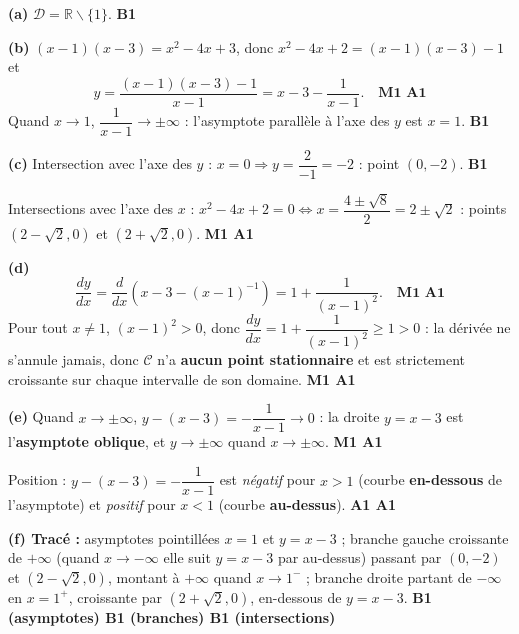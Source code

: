 \documentclass[11pt]{article}
\def\setminus{\mathbin{\backslash}}\let\smallsetminus\setminus
\begin{document}
\begin{corrige}
\textbf{(a)} $\mathcal{D} = \mathbb{R} \setminus \{1\}$. \hfill \textbf{B1}

\textbf{(b)} $(x-1)(x-3) = x^2 - 4x + 3$, donc $x^2 - 4x + 2 = (x-1)(x-3) - 1$ et
\[
y = \frac{(x-1)(x-3) - 1}{x-1} = x - 3 - \frac{1}{x-1}. \quad \textbf{M1 A1}
\]
Quand $x \to 1$, $\dfrac{1}{x-1} \to \pm\infty$ : l'asymptote parallèle à l'axe des $y$ est $x = 1$. \hfill \textbf{B1}

\textbf{(c)} Intersection avec l'axe des $y$ : $x = 0 \Rightarrow y = \dfrac{2}{-1} = -2$ : point $(0, -2)$. \hfill \textbf{B1}

Intersections avec l'axe des $x$ : $x^2 - 4x + 2 = 0 \iff x = \dfrac{4 \pm \sqrt{8}}{2} = 2 \pm \sqrt{2}$ : points $(2-\sqrt2, 0)$ et $(2+\sqrt2, 0)$. \hfill \textbf{M1 A1}

\textbf{(d)}
\[
\frac{dy}{dx} = \frac{d}{dx}\left(x - 3 - (x-1)^{-1}\right) = 1 + \frac{1}{(x-1)^2}. \quad \textbf{M1 A1}
\]
Pour tout $x \neq 1$, $(x-1)^2 > 0$, donc $\dfrac{dy}{dx} = 1 + \dfrac{1}{(x-1)^2} \ge 1 > 0$ : la dérivée ne s'annule jamais, donc $\mathcal{C}$ n'a \textbf{aucun point stationnaire} et est strictement croissante sur chaque intervalle de son domaine. \hfill \textbf{M1 A1}

\textbf{(e)} Quand $x \to \pm\infty$, $y - (x-3) = -\dfrac{1}{x-1} \to 0$ : la droite $y = x - 3$ est l'\textbf{asymptote oblique}, et $y \to \pm\infty$ quand $x \to \pm\infty$. \hfill \textbf{M1 A1}

Position : $y - (x-3) = -\dfrac{1}{x-1}$ est \emph{négatif} pour $x > 1$ (courbe \textbf{en-dessous} de l'asymptote) et \emph{positif} pour $x < 1$ (courbe \textbf{au-dessus}). \hfill \textbf{A1 A1}

\textbf{(f) Tracé :} asymptotes pointillées $x = 1$ et $y = x - 3$ ; branche gauche croissante de $+\infty$ (quand $x \to -\infty$ elle suit $y = x-3$ par au-dessus) passant par $(0,-2)$ et $(2-\sqrt2, 0)$, montant à $+\infty$ quand $x \to 1^-$ ; branche droite partant de $-\infty$ en $x = 1^+$, croissante par $(2+\sqrt2, 0)$, en-dessous de $y = x - 3$. \hfill \textbf{B1 (asymptotes) B1 (branches) B1 (intersections)}


\end{corrige}
\end{document}
